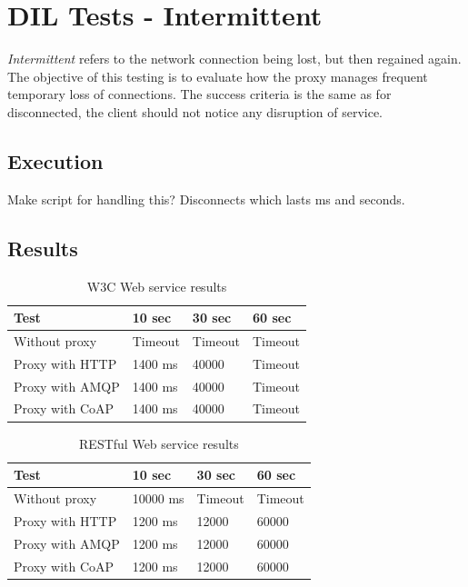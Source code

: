 \section{DIL Tests - Intermittent}

\textit{Intermittent} refers to the network connection being lost, but then
regained again. The objective of this testing is to evaluate how the proxy
manages frequent temporary loss of connections. The success criteria is the same
as for disconnected, the client should not notice any disruption of service.

\subsection{Execution}

Make script for handling this? Disconnects which lasts ms and seconds.

\subsection{Results}

\begin{table}[h!]
\begin{tabular}{| l | l | l | l |}
\hline
  \textbf{Test} & \textbf{10 sec} & \textbf{30 sec} & \textbf{60 sec} \\ \hline
  Without proxy & Timeout & Timeout & Timeout \\ \hline
  Proxy with HTTP & 1400 ms & 40000 & Timeout \\ \hline
  Proxy with AMQP & 1400 ms & 40000 & Timeout \\ \hline
  Proxy with CoAP & 1400 ms & 40000 & Timeout \\ \hline
\end{tabular}
\caption{W3C Web service results}
\end{table}

\begin{table}[h!]
\begin{tabular}{| l | l | l | l |}
\hline
  \textbf{Test} & \textbf{10 sec} & \textbf{30 sec} & \textbf{60 sec} \\ \hline
  Without proxy & 10000 ms & Timeout & Timeout \\ \hline
  Proxy with HTTP & 1200 ms & 12000 & 60000 \\ \hline
  Proxy with AMQP & 1200 ms & 12000 & 60000 \\ \hline
  Proxy with CoAP & 1200 ms & 12000 & 60000 \\ \hline
\end{tabular}
\caption{RESTful Web service results}
\end{table}

